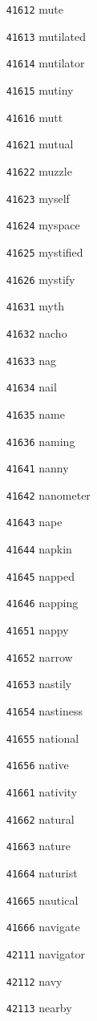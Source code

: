 \documentclass[twoside,11pt]{article}
\begin{document}
\begin{multicols}{5}
\begin{enumerate}
\item[\texttt{41612}] mute
\item[\texttt{41613}] mutilated
\item[\texttt{41614}] mutilator
\item[\texttt{41615}] mutiny
\item[\texttt{41616}] mutt
\item[\texttt{41621}] mutual
\item[\texttt{41622}] muzzle
\item[\texttt{41623}] myself
\item[\texttt{41624}] myspace
\item[\texttt{41625}] mystified
\item[\texttt{41626}] mystify
\item[\texttt{41631}] myth
\item[\texttt{41632}] nacho
\item[\texttt{41633}] nag
\item[\texttt{41634}] nail
\item[\texttt{41635}] name
\item[\texttt{41636}] naming
\item[\texttt{41641}] nanny
\item[\texttt{41642}] nanometer
\item[\texttt{41643}] nape
\item[\texttt{41644}] napkin
\item[\texttt{41645}] napped
\item[\texttt{41646}] napping
\item[\texttt{41651}] nappy
\item[\texttt{41652}] narrow
\item[\texttt{41653}] nastily
\item[\texttt{41654}] nastiness
\item[\texttt{41655}] national
\item[\texttt{41656}] native
\item[\texttt{41661}] nativity
\item[\texttt{41662}] natural
\item[\texttt{41663}] nature
\item[\texttt{41664}] naturist
\item[\texttt{41665}] nautical
\item[\texttt{41666}] navigate
\item[\texttt{42111}] navigator
\item[\texttt{42112}] navy
\item[\texttt{42113}] nearby

\end{enumerate}
\end{multicols}
\end{document}
